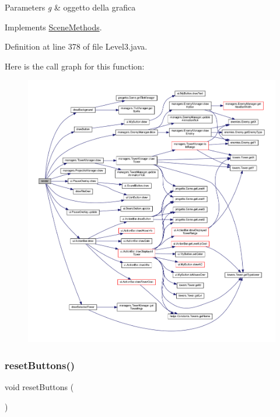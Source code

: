 \begin{DoxyParams}{Parameters}
{\em g} & oggetto della grafica \\
\hline
\end{DoxyParams}


Implements \hyperlink{interfacescenes_1_1_scene_methods_a203b6ad9d5e4d54dd1152986eec4dedc}{Scene\+Methods}.



Definition at line 378 of file Level3.\+java.

Here is the call graph for this function\+:
\nopagebreak
\begin{figure}[H]
\begin{center}
\leavevmode
\includegraphics[width=350pt]{classscenes_1_1_level3_a203b6ad9d5e4d54dd1152986eec4dedc_cgraph}
\end{center}
\end{figure}
\mbox{\label{classscenes_1_1_level3_a548cf4795e9d559d0c0cce0bb57a5251}} 
\subsubsection{\texorpdfstring{reset\+Buttons()}{resetButtons()}}
{\footnotesize\ttfamily void reset\+Buttons (\begin{DoxyParamCaption}{ }\end{DoxyParamCaption})\hspace{0.3cm}{\ttfamily [private]}}



